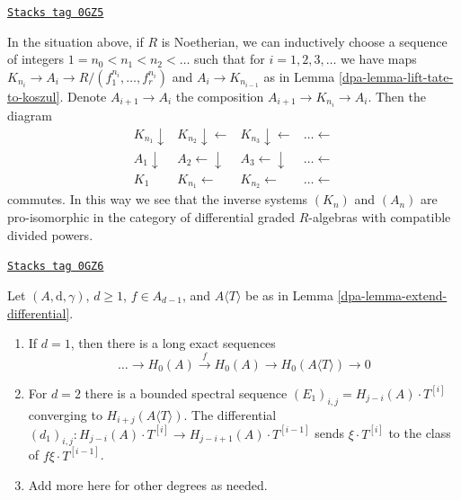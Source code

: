 \begin{remark}
\label{dpa-remark-pro-system-koszul}
\href{https://stacks.math.columbia.edu/tag/0GZ5}{\texttt{Stacks tag 0GZ5}}

In the situation above, if $R$ is Noetherian,
we can inductively choose a sequence
of integers $1 = n_0 < n_1 < n_2 < \ldots $ such that
for $i = 1, 2, 3, \ldots$ we have maps
$K_{n_i} \to A_i \to R/(f_1^{n_i}, \ldots, f_r^{n_i})$
and $A_i \to K_{n_{i - 1}}$ as in Lemma \ref{dpa-lemma-lift-tate-to-koszul}.
Denote $A_{i + 1} \to A_i$ the composition $A_{i + 1} \to K_{n_i} \to A_i$.
Then the diagram
$$
\begin{array}{cccc}K_{n_1} \downarrow & K_{n_2} \downarrow\longleftarrow & K_{n_3} \downarrow\longleftarrow & \ldots \longleftarrow \\ A_1 \downarrow & A_2 \longleftarrow\downarrow & A_3 \longleftarrow\downarrow & \ldots \longleftarrow \\ K_1 & K_{n_1} \longleftarrow & K_{n_2} \longleftarrow & \ldots \longleftarrow\end{array}
$$
commutes. In this way we see that the inverse systems
$(K_n)$ and $(A_n)$ are pro-isomorphic in the category of
differential graded $R$-algebras with compatible divided powers.
\end{remark}

\begin{lemma}
\label{dpa-lemma-compute-cohomology-adjoin-variable}
\href{https://stacks.math.columbia.edu/tag/0GZ6}{\texttt{Stacks tag 0GZ6}}

Let $(A, \text{d}, \gamma)$, $d \geq 1$, $f \in A_{d - 1}$,
and $A\langle T \rangle$ be as in Lemma \ref{dpa-lemma-extend-differential}.
\begin{enumerate}
\item If $d = 1$, then there is a long exact sequences
$$
\ldots \to H_0(A) \xrightarrow{f} H_0(A) \to H_0(A\langle T \rangle) \to 0
$$
\item For $d = 2$ there is a bounded spectral sequence
$(E_1)_{i, j} = H_{j - i}(A) \cdot T^{[i]}$
converging to $H_{i + j}(A\langle T \rangle)$. The differential
$(d_1)_{i, j} : H_{j - i}(A) \cdot T^{[i]} \to
H_{j - i + 1}(A) \cdot T^{[i - 1]}$
sends $\xi \cdot T^{[i]}$ to the class of $f \xi \cdot T^{[i - 1]}$.
\item Add more here for other degrees as needed.
\end{enumerate}
\end{lemma}

